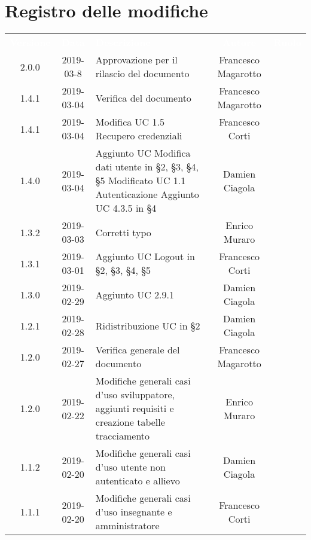 \section*{Registro delle modifiche}
{
	\renewcommand{\arraystretch}{1.5}
	\centering
	\begin{longtable}{ c c C{6cm} c c }
		\textcolor{white}{\textbf{Versione}} & \textcolor{white}{\textbf{Data}} & \textcolor{white}{\textbf{Descrizione}} & \textcolor{white}{\textbf{Autore}} & \textcolor{white}{\textbf{Ruolo}}\\
		2.0.0 &
		2019-03-8 &
		Approvazione per il rilascio del documento &
		Francesco Magarotto &
		\Res{} \\
		1.4.1 &
		2019-03-04 &
		Verifica del documento &
		Francesco Magarotto &
		\ver{} \\
		1.4.1 &
		2019-03-04 &
		Modifica UC 1.5 Recupero credenziali &
		Francesco Corti &
		\reda{} \\
		1.4.0 & 
		2019-03-04 &
		Aggiunto UC Modifica dati utente in §2, §3, §4, §5 \newline Modificato UC 1.1 Autenticazione \newline Aggiunto UC 4.3.5 in §4 &
		Damien Ciagola &
		\reda{} \\
		1.3.2 & 
		2019-03-03 &
		Corretti typo &
		Enrico Muraro &
		\reda{} \\
		1.3.1 &
		2019-03-01 &
		Aggiunto UC Logout in §2, §3, §4, §5 &
		Francesco Corti &
		\reda{} \\
		1.3.0 &
		2019-02-29 &
		Aggiunto UC 2.9.1 &
		Damien Ciagola&
		\reda{} \\
		1.2.1 &
		2019-02-28 &
		Ridistribuzione UC in §2 &
		Damien Ciagola&
		\reda{} \\	
		
		1.2.0 & 
		2019-02-27 &  
		Verifica generale del documento & 	
		Francesco Magarotto  &	
		\ver{} \\
		
		1.2.0 &
		2019-02-22 &
		Modifiche generali casi d'uso sviluppatore, aggiunti requisiti e creazione tabelle tracciamento &
		Enrico Muraro&
		\reda{} \\	
		
		1.1.2 &
		2019-02-20 &
		Modifiche generali casi d'uso utente non autenticato e allievo&
		Damien Ciagola&
		\reda{} \\		
				
		1.1.1 &
		2019-02-20 &
		Modifiche generali casi d'uso insegnante e amministratore&
		Francesco Corti&
		\reda{} \\		
				

\end{longtable}}
